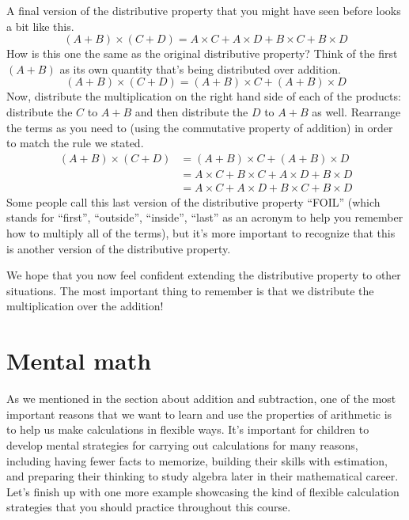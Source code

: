 \documentclass{ximera}
\begin{document}
A final version of the distributive property that you might have seen before looks a bit like this.
\[
(A + B) \times (C + D) = A\times C + A \times D + B \times C + B \times D
\]
How is this one the same as the original distributive property? Think of the first $(A+B)$ as its own quantity that's being distributed over addition.
\[
(A+B) \times (C+D) = (A+B) \times C + (A+B) \times D
\]
Now, distribute the multiplication on the right hand side of each of the products: distribute the $C$ to $A+B$ and then distribute the $D$ to $A+B$ as well. Rearrange the terms as you need to (using the commutative property of addition) in order to match the rule we stated.
\begin{align*}
(A+B) \times (C+D) &= (A+B) \times C + (A+B) \times D \\
& = A \times C + B \times C + A \times D + B \times D \\
& = A\times C + A \times D + B \times C + B \times D
\end{align*}
Some people call this last version of the distributive property ``FOIL'' (which stands for ``first'', ``outside'', ``inside'', ``last'' as an acronym to help you remember how to multiply all of the terms), but it's more important to recognize that this is another version of the distributive property.

We hope that you now feel confident extending the distributive property to other situations. The most important thing to remember is that we distribute the multiplication over the addition!




\section{Mental math}
As we mentioned in the section about addition and subtraction, one of the most important reasons that we want to learn and use the properties of arithmetic is to help us make calculations in flexible ways. It's important for children to develop mental strategies for carrying out calculations for many reasons, including having fewer facts to memorize, building their skills with estimation, and preparing their thinking to study algebra later in their mathematical career. Let's finish up with one more example showcasing the kind of flexible calculation strategies that you should practice throughout this course.
\end{document}
